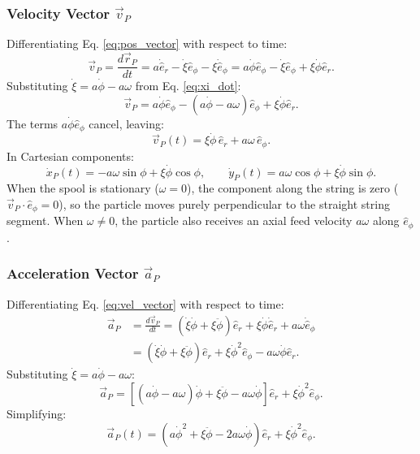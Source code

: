 \documentclass[11pt,a4paper]{article}
\begin{document}
\subsubsection{Velocity Vector $\vec{v}_P$}
Differentiating Eq. \eqref{eq:pos_vector} with respect to time:
\begin{equation}
    \vec{v}_P = \frac{d\vec{r}_P}{dt} = a\dot{\hat{e}}_r - \dot{\xi}\hat{e}_\phi - \xi\dot{\hat{e}}_\phi = a\dot{\phi}\hat{e}_\phi - \dot{\xi}\hat{e}_\phi + \xi\dot{\phi}\hat{e}_r.
\end{equation}
Substituting $\dot{\xi} = a\dot{\phi} - a\omega$ from Eq. \eqref{eq:xi_dot}:
\begin{equation}
    \vec{v}_P = a\dot{\phi}\hat{e}_\phi - (a\dot{\phi} - a\omega)\hat{e}_\phi + \xi\dot{\phi}\hat{e}_r.
\end{equation}
The terms $a\dot{\phi}\hat{e}_\phi$ cancel, leaving:
\begin{equation}
    \label{eq:vel_vector}
    \vec{v}_P(t) = \xi\dot{\phi}\,\hat{e}_r + a\omega\,\hat{e}_\phi.
\end{equation}
In Cartesian components:
\begin{equation}
    \label{eq:vel_cartesian}
    \dot{x}_P(t) = -a\omega\sin\phi + \xi\dot{\phi}\cos\phi, \qquad \dot{y}_P(t) = a\omega\cos\phi + \xi\dot{\phi}\sin\phi.
\end{equation}
When the spool is stationary ($\omega = 0$), the component along the string is zero ($\vec{v}_P \cdot \hat{e}_\phi = 0$), so the particle moves purely perpendicular to the straight string segment. When $\omega \neq 0$, the particle also receives an axial feed velocity $a\omega$ along $\hat{e}_\phi$.

\subsubsection{Acceleration Vector $\vec{a}_P$}
Differentiating Eq. \eqref{eq:vel_vector} with respect to time:
\begin{align}
    \vec{a}_P &= \frac{d\vec{v}_P}{dt} = (\dot{\xi}\dot{\phi} + \xi\ddot{\phi})\hat{e}_r + \xi\dot{\phi}\dot{\hat{e}}_r + a\omega\dot{\hat{e}}_\phi \nonumber \\
    &= (\dot{\xi}\dot{\phi} + \xi\ddot{\phi})\hat{e}_r + \xi\dot{\phi}^2\hat{e}_\phi - a\omega\dot{\phi}\hat{e}_r.
\end{align}
Substituting $\dot{\xi} = a\dot{\phi} - a\omega$:
\begin{equation}
    \vec{a}_P = \left[(a\dot{\phi} - a\omega)\dot{\phi} + \xi\ddot{\phi} - a\omega\dot{\phi}\right]\hat{e}_r + \xi\dot{\phi}^2\hat{e}_\phi.
\end{equation}
Simplifying:
\begin{equation}
    \label{eq:acc_vector}
    \vec{a}_P(t) = \left(a\dot{\phi}^2 + \xi\ddot{\phi} - 2a\omega\dot{\phi}\right)\hat{e}_r + \xi\dot{\phi}^2\hat{e}_\phi.
\end{equation}
\end{document}
